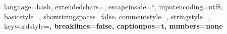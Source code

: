 
{
    language=bash,
    extendedchars=\true,
    escapeinside=``,
    inputencoding={utf8},
    basicstyle=\fontsize{10.3}{12.36}\ttfamily,
    showstringspaces=false,
    commentstyle=\color{Gray},
    stringstyle=\color{Red},
    keywordstyle=\color{BlueViolet}\bfseries,
    breaklines=false,
    captionpos=t,
    numbers=none
}
